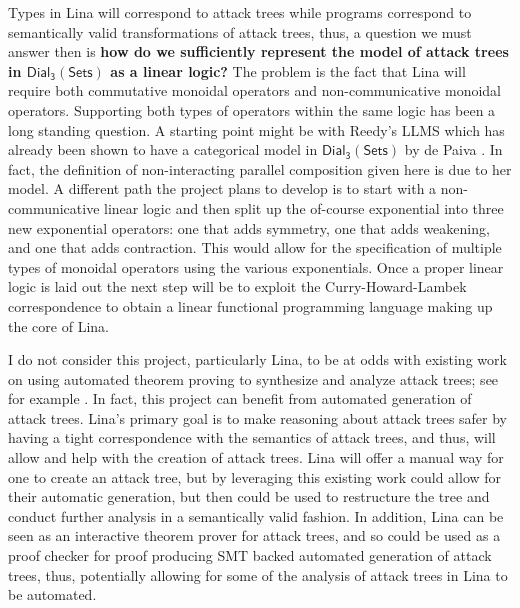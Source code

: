 \documentclass{sigplanconf}
\newcommand{\dial}[0]{\mathsf{Dial_3}(\mathsf{Sets})}
\begin{document}
Types in Lina will correspond to attack trees while programs
correspond to semantically valid transformations of attack trees,
thus, a question we must answer then is \textbf{how do we sufficiently
  represent the model of attack trees in $\dial$ as a linear logic?}
The problem is the fact that Lina will require both commutative
monoidal operators and non-communicative monoidal
operators. Supporting both types of operators within the same logic
has been a long standing question.  A starting point might be with
Reedy's LLMS which has already been shown to have a categorical model
in $\dial$ by de Paiva \cite{dePaiva:2014a}.  In fact, the definition
of non-interacting parallel composition given here is due to her
model.  A different path the project plans to develop is to start with
a non-communicative linear logic and then split up the of-course
exponential into three new exponential operators: one that adds
symmetry, one that adds weakening, and one that adds contraction.
This would allow for the specification of multiple types of monoidal
operators using the various exponentials.  Once a proper linear logic
is laid out the next step will be to exploit the Curry-Howard-Lambek
correspondence to obtain a linear functional programming language
making up the core of Lina.

I do not consider this project, particularly Lina, to be at odds with
existing work on using automated theorem proving to synthesize and
analyze attack trees; see for example
\cite{essay69399,Sheyner:2002:AGA:829514.830526,6957121,essay69402}.
In fact, this project can benefit from automated generation of attack
trees.  Lina's primary goal is to make reasoning about attack trees
safer by having a tight correspondence with the semantics of attack
trees, and thus, will allow and help with the creation of attack
trees.  Lina will offer a manual way for one to create an attack tree,
but by leveraging this existing work could allow for their automatic
generation, but then could be used to restructure the tree and conduct
further analysis in a semantically valid fashion.  In addition, Lina
can be seen as an interactive theorem prover for attack trees, and so
could be used as a proof checker \cite{Stump:2012} for proof producing
SMT backed automated generation of attack trees, thus, potentially
allowing for some of the analysis of attack trees in Lina to be
automated.
\end{document}
